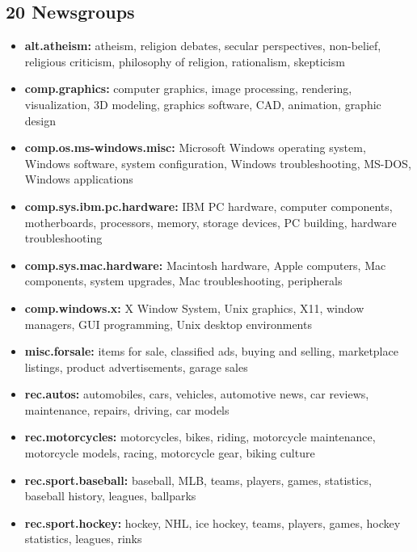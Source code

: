 \documentclass[sigconf,nonacm]{acmart}
\begin{document}
\subsection{20 Newsgroups}

\begin{itemize}
\item \textbf{alt.atheism:} atheism, religion debates, secular perspectives, non-belief, religious criticism, philosophy of religion, rationalism, skepticism

\item \textbf{comp.graphics:} computer graphics, image processing, rendering, visualization, 3D modeling, graphics software, CAD, animation, graphic design

\item \textbf{comp.os.ms-windows.misc:} Microsoft Windows operating system, Windows software, system configuration, Windows trouble\-shooting, MS-DOS, Windows applications

\item \textbf{comp.sys.ibm.pc.hardware:} IBM PC hardware, computer components, mother\-boards, processors, memory, storage devices, PC building, hardware trouble\-shooting

\item \textbf{comp.sys.mac.hardware:} Macintosh hardware, Apple computers, Mac components, system upgrades, Mac trouble\-shooting, peripherals

\item \textbf{comp.windows.x:} X Window System, Unix graphics, X11, window managers, GUI programming, Unix desktop environments

\item \textbf{misc.forsale:} items for sale, classified ads, buying and selling, market\-place listings, product advertisements, garage sales

\item \textbf{rec.autos:} automobiles, cars, vehicles, automotive news, car reviews, maintenance, repairs, driving, car models

\item \textbf{rec.motorcycles:} motorcycles, bikes, riding, motorcycle maintenance, motorcycle models, racing, motorcycle gear, biking culture

\item \textbf{rec.sport.baseball:} baseball, MLB, teams, players, games, statistics, baseball history, leagues, ballparks

\item \textbf{rec.sport.hockey:} hockey, NHL, ice hockey, teams, players, games, hockey statistics, leagues, rinks


\end{itemize}
\end{document}
